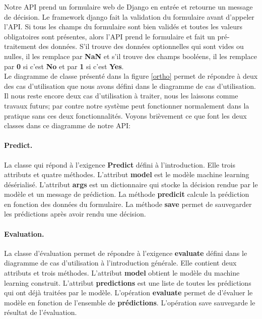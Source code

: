 \documentclass[12pt, french]{report}
\begin{document}
Notre API prend un formulaire web de Django en entrée et retourne un message de décision. Le framework django fait la validation du formulaire avant d'appeler l'API. Si tous les champs du formulaire sont bien validés et toutes les valeurs obligatoires sont présentes, alors l'API prend le formulaire et fait un pré-traitement des données. S'il trouve des données optionnelles qui sont vides ou nulles, il les remplace par \textbf{NaN} et s'il trouve des champs booléens, il les remplace par \textbf{0} si c'est \textbf{No} et par \textbf{1} si c'est \textbf{Yes}. \\

Le diagramme de classe présenté dans la figure \ref{ortho} permet de répondre à deux des cas d'utilisation que nous avons défini dans le diagramme de cas d'utilisation. Il nous reste encore deux cas d'utilisation à traiter, nous les laissons comme travaux futurs; par contre notre système peut fonctionner normalement dans la pratique sans ces deux fonctionnalités. Voyons brièvement ce que font les deux classes dans ce diagramme de notre API:

\paragraph{Predict. } La classe qui répond à l'exigence \textbf{Predict} défini à l'introduction. Elle trois attributs et quatre méthodes. L'attribut \textbf{model} est le modèle machine learning désérialisé. L'attribut \textbf{args} est un dictionnaire qui stocke la décision rendue par le modèle et un message de prédiction. La méthode \textbf{predicit} calcule la prédiction en fonction des données du formulaire. La méthode \textbf{save} permet de sauvegarder les prédictions après avoir rendu une décision. 
\paragraph{Evaluation. } La classe d'évaluation permet de répondre à l'exigence \textbf{evaluate} défini dans le diagramme de cas d'utilisation à l'introduction générale. Elle contient deux attributs et trois méthodes. L'attribut \textbf{model} obtient le modèle du machine learning construit. L'attribut \textbf{predictions} est une liste de toutes les prédictions qui ont déjà traitées par le modèle. L'opération \textbf{evaluate} permet de d'évaluer le modèle en fonction de l'ensemble de \textbf{prédictions}. L'opération save sauvegarde le résultat de l'évaluation. \\
\end{document}
